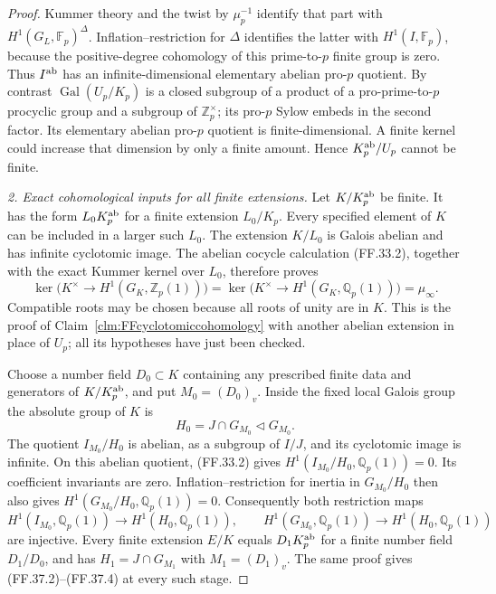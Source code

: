 \begin{proof}
Kummer theory and the twist by
\(\mu_p^{-1}\) identify that part
with \(H^1(G_L,\mathbb F_p)^\Delta\).
Inflation--restriction for \(\Delta\)
identifies the latter with
\(H^1(I,\mathbb F_p)\), because
the positive-degree cohomology of this
prime-to-\(p\) finite group is zero.
Thus \(I^{\rm ab}\) has an
infinite-dimensional elementary abelian
pro-\(p\) quotient. By contrast
\(\operatorname{Gal}(U_p/K_p)\)
is a closed subgroup of a product
of a pro-prime-to-\(p\) procyclic
group and a subgroup of
\(\mathbb Z_p^\times\); its pro-\(p\)
Sylow embeds in the second factor.
Its elementary abelian pro-\(p\)
quotient is finite-dimensional.
A finite kernel could increase that
dimension by only a finite amount.
Hence \(K_p^{\rm ab}/U_p\) cannot be finite.

\emph{2. Exact cohomological inputs for all finite extensions.}
Let \(K/K_p^{\rm ab}\) be finite.
It has the form \(L_0K_p^{\rm ab}\)
for a finite extension \(L_0/K_p\).
Every specified element of \(K\)
can be included in a larger such
\(L_0\). The extension \(K/L_0\)
is Galois abelian and has infinite
cyclotomic image. The abelian cocycle
calculation (FF.33.2), together with
the exact Kummer kernel over \(L_0\),
therefore proves
\[
 \ker\bigl(K^\times\to H^1(G_K,\mathbb Z_p(1))\bigr)
 =\ker\bigl(K^\times\to H^1(G_K,\mathbb Q_p(1))\bigr)
 =\mu_\infty.
                                                        \tag{FF.37.2}
\]
Compatible roots may be chosen because
all roots of unity are in \(K\).
This is the proof of
Claim~\ref{clm:FFcyclotomiccohomology}
with another abelian extension in
place of \(U_p\); all its hypotheses
have just been checked.

Choose a number field \(D_0\subset K\)
containing any prescribed finite data
and generators of \(K/K_p^{\rm ab}\),
and put \(M_0=(D_0)_v\). Inside the
fixed local Galois group the absolute
group of \(K\) is
\[
            H_0=J\cap G_{M_0}
                         \triangleleft G_{M_0}.
                                                        \tag{FF.37.3}
\]
The quotient \(I_{M_0}/H_0\) is
abelian, as a subgroup of \(I/J\),
and its cyclotomic image is infinite.
On this abelian quotient, (FF.33.2)
gives \(H^1(I_{M_0}/H_0,\mathbb Q_p(1))=0\).
Its coefficient invariants are zero.
Inflation--restriction for inertia
in \(G_{M_0}/H_0\) then also gives
\(H^1(G_{M_0}/H_0,\mathbb Q_p(1))=0\).
Consequently both restriction maps
\[
 H^1(I_{M_0},\mathbb Q_p(1))\longrightarrow H^1(H_0,\mathbb Q_p(1)),
 \qquad
 H^1(G_{M_0},\mathbb Q_p(1))\longrightarrow H^1(H_0,\mathbb Q_p(1))
                                                        \tag{FF.37.4}
\]
are injective. Every finite extension
\(E/K\) equals \(D_1K_p^{\rm ab}\)
for a finite number field \(D_1/D_0\),
and has \(H_1=J\cap G_{M_1}\) with
\(M_1=(D_1)_v\). The same proof gives
(FF.37.2)--(FF.37.4) at every such stage.


\end{proof}
